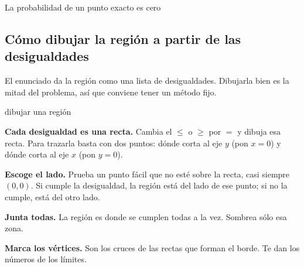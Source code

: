 \begin{afondo}{La probabilidad de un punto exacto es cero}
\begin{center}
\end{center}
\end{afondo}

\subsection{Cómo dibujar la región a partir de las desigualdades}

El enunciado da la región como una lista de desigualdades. Dibujarla bien es la mitad del problema, así que conviene tener
un método fijo.

\begin{receta}{dibujar una región}
\begin{pasosreceta}
\item \textbf{Cada desigualdad es una recta.} Cambia el $\le$ o $\ge$ por $=$ y dibuja esa recta. Para trazarla basta con dos
puntos: dónde corta al eje $y$ (pon $x=0$) y dónde corta al eje $x$ (pon $y=0$).
\item \textbf{Escoge el lado.} Prueba un punto fácil que no esté sobre la recta, casi siempre $(0,0)$. Si cumple la desigualdad,
la región está del lado de ese punto; si no la cumple, está del otro lado.
\item \textbf{Junta todas.} La región es donde se cumplen todas a la vez. Sombrea sólo esa zona.
\item \textbf{Marca los vértices.} Son los cruces de las rectas que forman el borde. Te dan los números de los límites.
\end{pasosreceta}
\end{receta}

